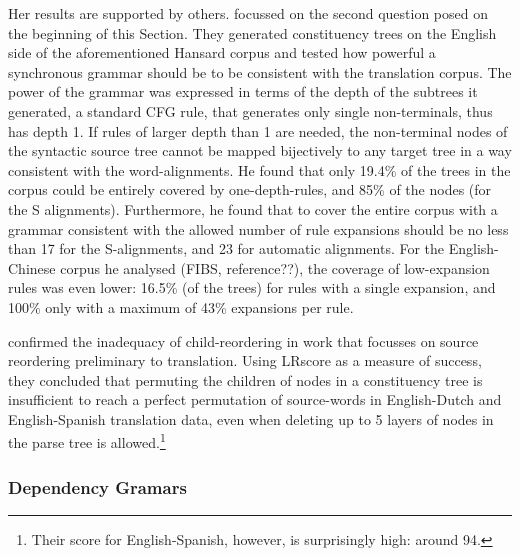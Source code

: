 \documentclass{report}
\theoremstyle{break}
\begin{document}
Her results are supported by others. \cite{galley2004s} focussed on the second question posed on the beginning of this Section. They generated constituency trees on the English side of the aforementioned Hansard corpus and tested how powerful a synchronous grammar should be to be consistent with the translation corpus. The power of the grammar was expressed in terms of the depth of the subtrees it generated, a standard CFG rule, that generates only single non-terminals, thus has depth 1. If rules of larger depth than 1 are needed, the non-terminal nodes of the syntactic source tree cannot be mapped bijectively to any target tree in a way consistent with the word-alignments. He found that only 19.4\% of the trees in the corpus could be entirely covered by one-depth-rules, and 85\% of the nodes (for the S alignments). Furthermore, he found that to cover the entire corpus with a grammar consistent with the allowed number of rule expansions should be no less than 17 for the S-alignments, and 23 for automatic alignments. For the English-Chinese corpus he analysed (FIBS, reference??), the coverage of low-expansion rules was even lower: 16.5\% (of the trees) for rules with a single expansion, and 100\% only with a maximum of 43\% expansions per rule.

\cite{khalilov2012statistical} confirmed the inadequacy of child-reordering in work that focusses on source reordering preliminary to translation. Using LRscore \citep{birch2010lrscore} as a measure of success, they concluded that permuting the children of nodes in a constituency tree is insufficient to reach a perfect permutation of source-words in English-Dutch and English-Spanish translation data, even when deleting up to 5 layers of nodes in the parse tree is allowed.\footnote{Their score for English-Spanish, however, is surprisingly high: around 94.}


\subsubsection{Dependency Gramars}
\end{document}
